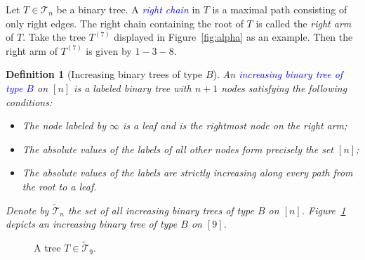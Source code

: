 \documentclass[12pt]{article}
\def\blue{\textcolor{blue}}
\def\blue{\textcolor{blue}}
\numberwithin{equation}{section}
\def\blue{\textcolor{blue}}
\def\blue{\textcolor{blue}}
\theoremstyle{plain}
\newtheorem{definition}[theorem]{Definition}
\def\B{\mathcal{T}}
\begin{document}
	 	
	 	
	 	
	 	 	Let $T\in \B_n$ be a binary tree.  A \blue{\em right chain}  in $T$ is a maximal path consisting of only right  edges.  The right chain containing the root of $T$ is called the {\em right arm} of $T$.  Take the tree $T^{(7)}$ displayed in Figure~\ref{fig:alpha} as an example. Then the right arm of $T^{(7)}$ is given by $1-3-8$.
	 	 	
	 	 		\begin{definition}[Increasing binary trees of type $B$]
	 	
	 	 		An \blue{increasing binary tree of type $B$} on $[n]$ is a labeled binary tree with $n+1$ nodes satisfying the following conditions:
	 	 		\begin{itemize}
	 	 			\item  The node labeled by $\infty$ is a leaf  and is the rightmost node on the right arm;
	 	 			\item The absolute values of the labels of all other nodes form precisely the set  $[n]$;
	 	 			\item The absolute values of the labels are strictly increasing along every path from the root to a leaf.
	 	 		\end{itemize}
	 	 
	 	 	 
	 	 		Denote by $\widetilde{\B}_n$ the set of all   increasing binary trees  of
	 	 		 type $B$ on $[n]$. Figure~\ref{fig:tree-B} depicts an increasing binary tree of type $B$ on $[9]$.
	 	 	\end{definition}
	 	
	 	\begin{figure}[htbp]
	 		\centering
	 		\caption{ A tree  $T\in \widetilde{\B}_9$. }\label{fig:tree-B}
	 	\end{figure}
	 	
\end{document}
